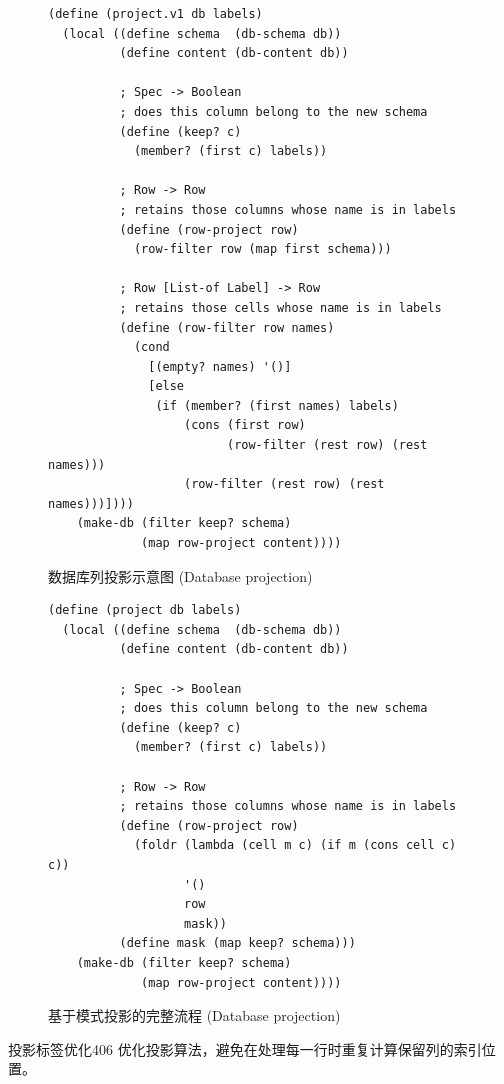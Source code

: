 \begin{figure}[htbp]
  \centering
\begin{lstlisting}[language=BSL, basicstyle=\scriptsize\ttfamily]
(define (project.v1 db labels)
  (local ((define schema  (db-schema db))
          (define content (db-content db))

          ; Spec -> Boolean
          ; does this column belong to the new schema
          (define (keep? c)
            (member? (first c) labels))

          ; Row -> Row
          ; retains those columns whose name is in labels
          (define (row-project row)
            (row-filter row (map first schema)))

          ; Row [List-of Label] -> Row
          ; retains those cells whose name is in labels
          (define (row-filter row names)
            (cond
              [(empty? names) '()]
              [else
               (if (member? (first names) labels)
                   (cons (first row)
                         (row-filter (rest row) (rest names)))
                   (row-filter (rest row) (rest names)))])))
    (make-db (filter keep? schema)
             (map row-project content))))
\end{lstlisting}
  \caption{数据库列投影示意图 (Database projection)}
  \label{fig:141}
\end{figure}

\begin{figure}[htbp]
  \centering
\begin{lstlisting}[language=BSL, basicstyle=\scriptsize\ttfamily]
(define (project db labels)
  (local ((define schema  (db-schema db))
          (define content (db-content db))

          ; Spec -> Boolean
          ; does this column belong to the new schema
          (define (keep? c)
            (member? (first c) labels))

          ; Row -> Row
          ; retains those columns whose name is in labels
          (define (row-project row)
            (foldr (lambda (cell m c) (if m (cons cell c) c))
                   '()
                   row
                   mask))
          (define mask (map keep? schema)))
    (make-db (filter keep? schema)
             (map row-project content))))
\end{lstlisting}
  \caption{基于模式投影的完整流程 (Database projection)}
  \label{fig:142}
\end{figure}

\begin{exercise}{投影标签优化}{406}
优化投影算法，避免在处理每一行时重复计算保留列的索引位置。
\end{exercise}

